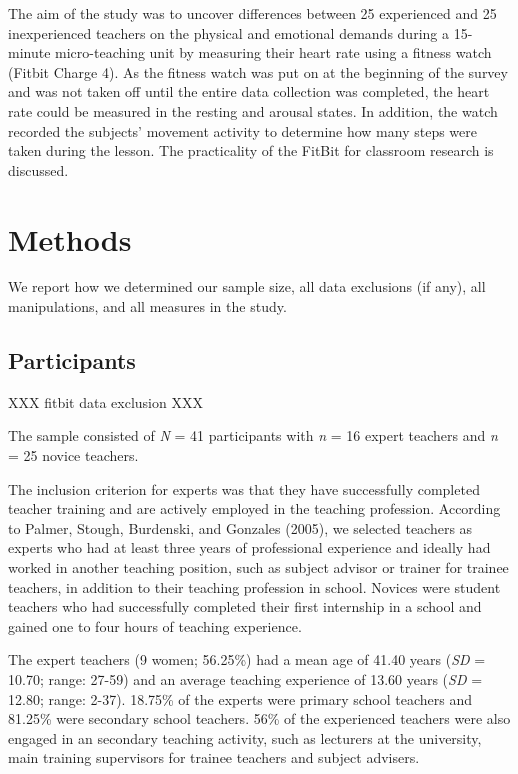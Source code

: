 \documentclass[
  man]{apa6}
\begin{document}
The aim of the study was to uncover differences between 25 experienced and 25 inexperienced teachers on the physical and emotional demands during a 15-minute micro-teaching unit by measuring their heart rate using a fitness watch (Fitbit Charge 4). As the fitness watch was put on at the beginning of the survey and was not taken off until the entire data collection was completed, the heart rate could be measured in the resting and arousal states. In addition, the watch recorded the subjects' movement activity to determine how many steps were taken during the lesson. The practicality of the FitBit for classroom research is discussed.

\hypertarget{methods}{%
\section{Methods}\label{methods}}

We report how we determined our sample size, all data exclusions (if any), all manipulations, and all measures in the study.

\hypertarget{participants}{%
\subsection{Participants}\label{participants}}

XXX fitbit data exclusion XXX

The sample consisted of \emph{N} = 41 participants with \emph{n} = 16 expert teachers and \emph{n} = 25 novice teachers.

The inclusion criterion for experts was that they have successfully completed teacher training and are actively employed in the teaching profession. According to Palmer, Stough, Burdenski, and Gonzales (2005), we selected teachers as experts who had at least three years of professional experience and ideally had worked in another teaching position, such as subject advisor or trainer for trainee teachers, in addition to their teaching profession in school. Novices were student teachers who had successfully completed their first internship in a school and gained one to four hours of teaching experience.

The expert teachers (9 women; 56.25\%) had a mean age of 41.40 years (\emph{SD} = 10.70; range: 27-59) and an average teaching experience of 13.60 years (\emph{SD} = 12.80; range: 2-37).
18.75\% of the experts were primary school teachers and 81.25\% were secondary school teachers. 56\% of the experienced teachers were also engaged in an secondary teaching activity, such as lecturers at the university, main training supervisors for trainee teachers and subject advisers.
\end{document}
